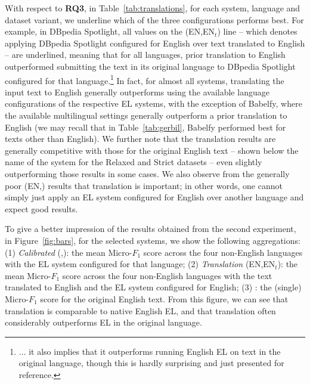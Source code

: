\documentclass{llncs}
\begin{document}

With respect to \textbf{RQ3}, in Table~\ref{tab:translations}, for each system, language and dataset variant, we underline which of the three configurations performs best. For example, in DBpedia Spotlight, all values on the (EN,EN$_t$) line -- which denotes applying DBpedia Spotlight configured for English over text translated to English -- are underlined, meaning that for all languages, prior translation to English outperformed submitting the text in its original language to DBpedia Spotlight configured for that language.\footnote{$\ldots$ it also implies that it outperforms running English EL on text in the original language, though this is hardly surprising and just presented for reference.}
In fact, for almost all systems, translating the input text to English generally outperforms using the available language configurations of the respective EL systems, with the exception of Babelfy, where the available multilingual settings generally outperform a prior translation to English (we may recall that in Table~\ref{tab:gerbil}, Babelfy performed best for texts other than English). We further note that the translation results are generally competitive with those for the original English text -- shown below the name of the system for the Relaxed and Strict datasets -- even slightly outperforming those results in some cases. We also observe from the generally poor (EN,\blank) results that translation is important; in other words, one cannot simply just apply an EL system configured for English over another language and expect good results.

To give a better impression of the results obtained from the second experiment, in Figure~\ref{fig:bars}, for the selected systems, we show the following aggregations: (1) \textit{Calibrated} (\blank,\blank): the mean Micro-$F_1$ score across the four non-English languages with the EL system configured for that language; (2) \textit{Translation} (EN,EN$_t$): the mean Micro-$F_1$ score across the four non-English languages with the text translated to English and the EL system configured for English; (3) : the (single) Micro-$F_1$ score for the original English text. From this figure, we can see  that translation is comparable to native English EL, and that translation often considerably outperforms EL in the original language. 
\end{document}
